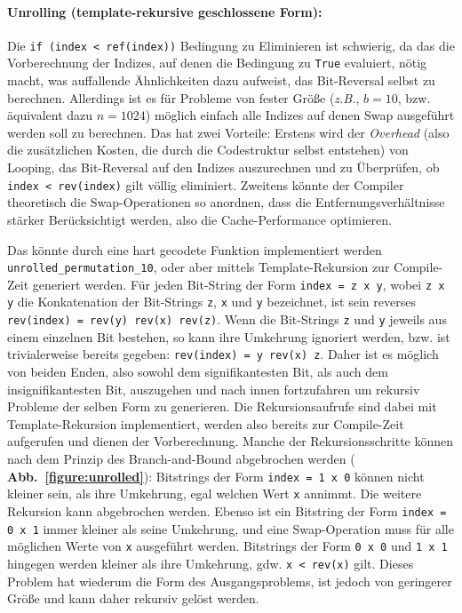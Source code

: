 \documentclass[10pt]{article}
\begin{document}
\paragraph{Unrolling (template-rekursive geschlossene Form):}

Die {\tt if (index < ref(index))} Bedingung zu Eliminieren ist schwierig, da 
das die Vorberechnung der Indizes, auf denen die Bedingung zu {\tt True} evaluiert,
nötig macht, was auffallende Ähnlichkeiten dazu aufweist, das Bit-Reversal selbst zu berechnen.
Allerdings ist es für Probleme von fester Größe (\emph{z.B.}, $b = 10$, bzw. äquivalent dazu $n=1024$)
möglich einfach alle Indizes auf denen Swap ausgeführt werden soll zu berechnen. Das hat zwei Vorteile:
Erstens wird der {\it Overhead} (also die zusätzlichen Kosten, die durch die Codestruktur selbst entstehen) 
von Looping, das Bit-Reversal auf den Indizes auszurechnen und zu Überprüfen, ob {\tt 
index < rev(index)} gilt völlig eliminiert. Zweitens könnte der Compiler theoretisch die Swap-Operationen so anordnen, 
dass die Entfernungsverhältnisse stärker Berücksichtigt werden, also die Cache-Performance optimieren.

Das könnte durch eine hart gecodete Funktion implementiert werden {\tt unrolled\_permutation\_10}, 
oder aber mittels Template-Rekursion zur Compile-Zeit generiert werden. 
Für jeden Bit-String der Form {\tt index = z x y}, wobei {\tt z x y} die Konkatenation der Bit-Strings
{\tt z}, {\tt x} und {\tt y} bezeichnet, ist sein reverses  {\tt rev(index) = rev(y) rev(x)
rev(z)}. Wenn die Bit-Strings {\tt z} und {\tt y} jeweils aus einem einzelnen Bit bestehen, so kann 
ihre Umkehrung ignoriert werden, bzw. ist trivialerweise bereits gegeben: {\tt rev(index) = y rev(x) z}. 
Daher ist es möglich von beiden Enden, also sowohl dem signifikantesten Bit, als auch dem insignifikantesten Bit,
auszugehen und nach innen fortzufahren um rekursiv Probleme der selben Form zu generieren. Die Rekursionsaufrufe
sind dabei mit Template-Rekursion implementiert, werden also bereits zur Compile-Zeit aufgerufen und dienen der
Vorberechnung. Manche der Rekursionsschritte können nach dem Prinzip des Branch-and-Bound abgebrochen werden
({ \bf Abb.~\ref{figure:unrolled}}):
Bitstrings der Form {\tt index = 1~x~0} können nicht kleiner sein, als ihre Umkehrung, egal welchen Wert {\tt x} annimmt. 
Die weitere Rekursion kann abgebrochen werden. Ebenso ist ein Bitstring der Form {\tt index = 0~x~1} immer kleiner als seine 
Umkehrung, und eine Swap-Operation muss für alle möglichen Werte von {\tt x} ausgeführt werden. Bitstrings der Form
{\tt 0~x~0} und {\tt 1~x~1} hingegen werden kleiner als ihre Umkehrung, gdw. {\tt x < rev(x)} gilt. Dieses Problem hat wiederum
die Form des Ausgangsproblems, ist jedoch von geringerer Größe und kann daher rekursiv gelöst werden.
\end{document}
